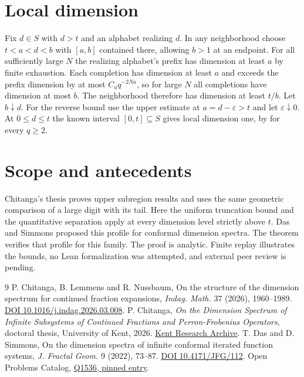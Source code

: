 \documentclass[11pt,a4paper]{amsart}
\begin{document}
\section{Local dimension}
Fix $d\in S$ with $d>t$ and an alphabet realizing $d$. In any neighborhood choose $t<a<d<b$ with $[a,b]$ contained there, allowing $b>1$ at an endpoint. For all sufficiently large $N$ the realizing alphabet's prefix has dimension at least $a$ by finite exhaustion. Each completion has dimension at least $a$ and exceeds the prefix dimension by at most $C_a q^{-2Na}$, so for large $N$ all completions have dimension at most $b$. The neighborhood therefore has dimension at least $t/b$. Let $b\downarrow d$. For the reverse bound use the upper estimate at $a=d-\varepsilon>t$ and let $\varepsilon\downarrow0$. At $0\le d\le t$ the known interval $[0,t]\subseteq S$ gives local dimension one, by \cite[Theorem~1.4]{cln} for every $q\ge2$.

\section{Scope and antecedents}
Chitanga's thesis \cite[Theorems~5.2--5.3 and Section~5.2]{thesis} proves upper subregion results and uses the same geometric comparison of a large digit with its tail. Here the uniform truncation bound and the quantitative separation apply at every dimension level strictly above $t$. Das and Simmons \cite[Conjecture~5.4 and Remark~5.6]{ds} proposed this profile for conformal dimension spectra. The theorem verifies that profile for this family. The proof is analytic. Finite replay illustrates the bounds, no Lean formalization was attempted, and external peer review is pending.

\begin{thebibliography}{9}
 P. Chitanga, B. Lemmens and R. Nussbaum, On the structure of the dimension spectrum for continued fraction expansions, \emph{Indag. Math.} 37 (2026), 1960--1989. \href{https://doi.org/10.1016/j.indag.2026.03.008}{DOI 10.1016/j.indag.2026.03.008}.
 P. Chitanga, \emph{On the Dimension Spectrum of Infinite Subsystems of Continued Fractions and Perron-Frobenius Operators}, doctoral thesis, University of Kent, 2026. \href{https://kar.kent.ac.uk/114012/}{Kent Research Archive}.
 T. Das and D. Simmons, On the dimension spectra of infinite conformal iterated function systems, \emph{J. Fractal Geom.} 9 (2022), 73--87. \href{https://doi.org/10.4171/JFG/112}{DOI 10.4171/JFG/112}.
 Open Problems Catalog, \href{https://github.com/10m-u/open-problems-catalog/blob/ca8d4d44ba3db527f19f28928c240168f545ecfe/problems/mathematics/differential-equations-dynamical-systems.md\#q1536}{Q1536, pinned entry}.
\end{thebibliography}
\end{document}
